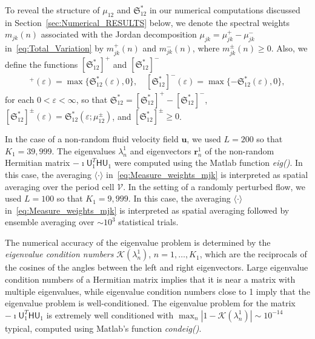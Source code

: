 \documentclass[english,12pt,jmp,graphicx]{revtex4-1}
\newcommand{\vecu}{\boldsymbol{u}}
\newcommand{\secref}[1]{Section~\ref{#1}}
\newcommand{\Vc}{\mathcal{V}}
\newcommand{\Sg}{\mathfrak{S}}
\newcommand{\vecr}{\boldsymbol{r}}
\newcommand{\Hm}{\mathsf{H}}
\newcommand{\Um}{\mathsf{U}}
\begin{document}
To reveal the structure of $\mu_{12}$ and $\Sg^*_{12}$ in our
numerical computations discussed in \secref{sec:Numerical_RESULTS}
below, we denote the spectral weights $m_{jk}(n)$ associated 
with the Jordan decomposition $\mu_{jk}=\mu_{jk}^+-\mu_{jk}^-$
in~\eqref{eq:Total_Variation} by $m_{jk}^+(n)$ and $m_{jk}^-(n)$,
where $m_{jk}^\pm(n)\geq0$. Also, we define the
functions
$[\Sg^*_{12}]^+$ and $[\Sg^*_{12}]^-$    
%
\begin{align}
  [\Sg^*_{12}]^+(\varepsilon)=\max\{\Sg^*_{12}(\varepsilon),0\},
  \quad
  [\Sg^*_{12}]^-(\varepsilon)=\max\{-\Sg^*_{12}(\varepsilon),0\},
\end{align}
%
for each $0<\varepsilon<\infty$, so that 
$\Sg^*_{12}=[\Sg^*_{12}]^+-[\Sg^*_{12}]^-$,
$[\Sg^*_{12}]^\pm(\varepsilon)=\Sg^*_{12}(\varepsilon;\mu_{12}^\pm)$,  and $[\Sg^*_{12}]^\pm\geq0$. 




In the case of a non-random fluid velocity field $\vecu$, we used
$L=200$ so that $K_1=39,999$. The eigenvalues $\lambda_n^1$ and eigenvectors
$\vecr_n^1$ of the non-random Hermitian matrix $-\imath\Um_1^T\Hm\Um_1$
were computed using the Matlab function \emph{eig()}. In this case,
the averaging $\langle\cdot\rangle$ in~\eqref{eq:Measure_weights_mjk} is interpreted
as spatial averaging over the period cell $\Vc$. In the setting of a
randomly perturbed flow, we
used $L=100$ so that $K_1=9,999$. In this case, the averaging $\langle\cdot\rangle$
in~\eqref{eq:Measure_weights_mjk} is interpreted as spatial averaging
followed by ensemble averaging over $\sim10^3$ statistical trials.



The numerical accuracy of the eigenvalue problem
is determined by the \emph{eigenvalue condition numbers}
$\mathcal{K}(\lambda_n^1)$, $n=1,\ldots,K_1$, which are the reciprocals of the cosines
of the angles between the left and right eigenvectors. Large
eigenvalue condition numbers of a Hermitian matrix implies that it is
near a matrix with multiple eigenvalues, while eigenvalue condition
numbers close to 1 imply that the eigenvalue problem is
well-conditioned. The eigenvalue problem for the matrix
$-\imath\Um_1^T\Hm\Um_1$ is extremely well conditioned with
$\max_n|1-\mathcal{K}(\lambda_n^1)|\sim10^{-14}$ typical, computed
using Matlab's function \emph{condeig()}.
\end{document}
